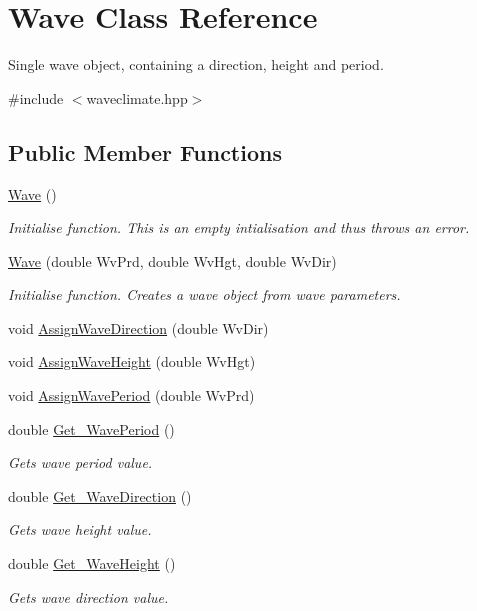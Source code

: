\hypertarget{classWave}{\section{Wave Class Reference}
\label{classWave}
}


Single wave object, containing a direction, height and period.  




{\ttfamily \#include $<$waveclimate.\-hpp$>$}

\subsection*{Public Member Functions}
\begin{DoxyCompactItemize}
\item 
\hyperlink{classWave_a3d8144ec0d6c0b0ede77ff59f54471aa}{Wave} ()
\begin{DoxyCompactList}\small\item\em Initialise function. This is an empty intialisation and thus throws an error. \end{DoxyCompactList}\item 
\hyperlink{classWave_abeca06948654c515bb8c42f1610bd161}{Wave} (double Wv\-Prd, double Wv\-Hgt, double Wv\-Dir)
\begin{DoxyCompactList}\small\item\em Initialise function. Creates a wave object from wave parameters. \end{DoxyCompactList}\item 
void \hyperlink{classWave_aec0664696d6df103f14fde5b8337db9a}{Assign\-Wave\-Direction} (double Wv\-Dir)
\item 
void \hyperlink{classWave_ae0a0a3d5a698f5477e3181eb8b2c5948}{Assign\-Wave\-Height} (double Wv\-Hgt)
\item 
void \hyperlink{classWave_aaf0e9f1666aa20ec6442c77536aa700a}{Assign\-Wave\-Period} (double Wv\-Prd)
\item 
double \hyperlink{classWave_ac6cd4c117a447dcc1cf27bef9a93a6bd}{Get\-\_\-\-Wave\-Period} ()
\begin{DoxyCompactList}\small\item\em Gets wave period value. \end{DoxyCompactList}\item 
double \hyperlink{classWave_a2c4fac2cb35b549bf9fbdfe9c0adcf8a}{Get\-\_\-\-Wave\-Direction} ()
\begin{DoxyCompactList}\small\item\em Gets wave height value. \end{DoxyCompactList}\item 
double \hyperlink{classWave_a75e11cdebacdfdcba0420e421a56ce5d}{Get\-\_\-\-Wave\-Height} ()
\begin{DoxyCompactList}\small\item\em Gets wave direction value. \end{DoxyCompactList}\end{DoxyCompactItemize}


